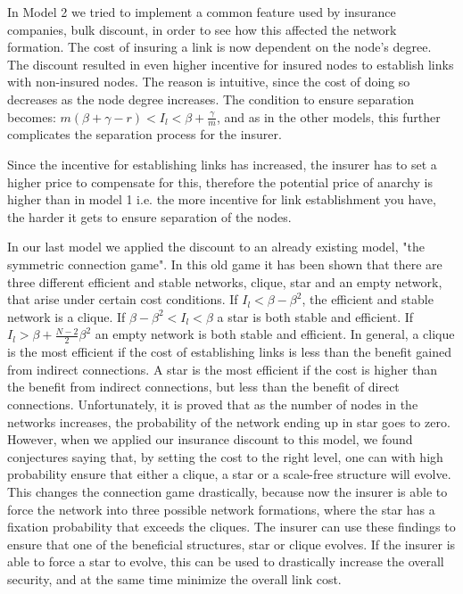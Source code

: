 In Model 2 we tried to implement a common feature used by insurance companies, bulk discount, in order to see how this affected the network formation. The cost of insuring a link is now dependent on the node's degree. 
The discount resulted in even higher incentive for insured nodes to establish links with non-insured nodes. The reason is intuitive, since the cost of doing so decreases as the node degree increases. 
The condition to ensure separation becomes: $m(\beta+\gamma-r)<I_{l}<\beta+\frac{\gamma}{m}$, and as in the other models, this further complicates the separation process for the insurer. 

Since the incentive for establishing links has increased, the insurer has to set a higher price to compensate for this, therefore the potential price of anarchy is higher than in model 1 i.e. the more incentive for link establishment you have, the harder it gets to ensure separation of the nodes.  

In our last model we applied the discount to an already existing model, "the symmetric connection game". In this old game it has been shown that there are three different efficient and stable networks, clique, star and an empty network, that arise under certain cost conditions. If $I_{l}<\beta-\beta^{2}$, the efficient and stable network is a clique. If $\beta-\beta^{2}<I_{l}<\beta$ a star is both stable and efficient. If $I_{l}>\beta+\frac{N-2}{2}\beta^{2}$ an empty network is both stable and efficient. In general, a clique is the most efficient if the cost of establishing links is less than the benefit gained from indirect connections. A star is the most efficient if the cost is higher than the benefit from indirect connections, but less than the benefit of direct connections. 
Unfortunately, it is proved that as the number of nodes in the networks increases, the probability of the network ending up in star goes to zero. However, when we applied our insurance discount to this model, we found conjectures saying that, by setting the cost to the right level, one can with high probability ensure that either a clique, a star or a scale-free structure will evolve. This changes the connection game drastically, because now the insurer is able to force the network into three possible network formations, where the star has a fixation probability that exceeds the cliques. The insurer can use these findings to ensure that one of the beneficial structures, star or clique evolves. If the insurer is able to force a star to evolve, this can be used to drastically increase the overall security, and at the same time minimize the overall link cost. 
